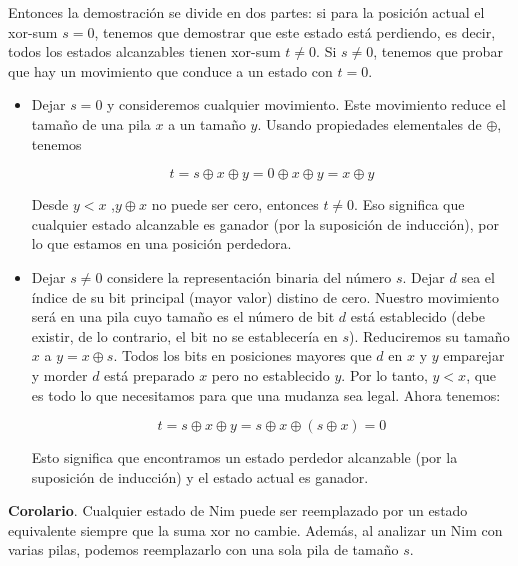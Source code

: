 Entonces la demostración se divide en dos partes: si para la posición actual el xor-sum $s = 0$, tenemos que demostrar que este estado está perdiendo, es decir, todos los estados alcanzables tienen xor-sum $t \neq 0$. Si $s \neq 0$, tenemos que probar que hay un movimiento que conduce a un estado con $t = 0$.

\begin{itemize}
	\item Dejar $s = 0$ y consideremos cualquier movimiento. Este movimiento reduce el tamaño de una pila $x$ a un tamaño $y$. Usando propiedades elementales de $\oplus$, tenemos
	
	$$t = s \oplus x \oplus y = 0 \oplus x \oplus y = x \oplus y$$
	
	Desde $y<x$ ,$y \oplus x$ no puede ser cero, entonces $t \neq 0$. Eso significa que cualquier estado alcanzable es ganador (por la suposición de inducción), por lo que estamos en una posición perdedora.
	
	\item Dejar $s \neq 0$ considere la representación binaria del número $s$. Dejar $d$ sea el índice de su bit principal (mayor valor) distino de cero. Nuestro movimiento será en una pila cuyo tamaño es el número de bit $d$ está establecido (debe existir, de lo contrario, el bit no se establecería en 
	$s$). Reduciremos su tamaño $x$ a $y = x \oplus s$. Todos los bits en posiciones mayores que $d$ en 
	$x$ y $y$ emparejar y morder $d$ está preparado $x$ pero no establecido $y$. Por lo tanto, $y<x$, que 
	es todo lo que necesitamos para que una mudanza sea legal. Ahora tenemos:
	
	$$t = s \oplus x \oplus y = s \oplus x \oplus (s \oplus x) = 0$$
	
	Esto significa que encontramos un estado perdedor alcanzable (por la suposición de inducción) y el estado actual es ganador.
\end{itemize}

\textbf{Corolario}. Cualquier estado de Nim puede ser reemplazado por un estado equivalente siempre que la suma xor no cambie. Además, al analizar un Nim con varias pilas, podemos reemplazarlo con una sola pila de tamaño $s$.

